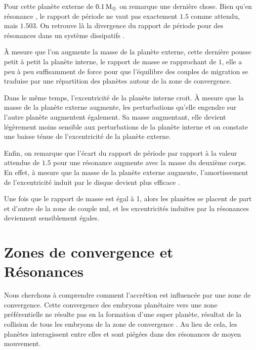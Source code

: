 Pour cette planète externe de $0.1\mathrm{\thinspace M_\oplus}$ on remarque une dernière chose. Bien qu'en résonance , le rapport de période
ne vaut pas exactement $1.5$ comme attendu, mais $1.503$. On retrouve là la divergence du rapport de période pour des
résonances dans un système dissipatifs \citep{batygin2013dissipative}. 

\bigskip

À mesure que l'on augmente la masse de la planète externe, cette dernière pousse petit à petit la planète interne, le rapport
de masse se rapprochant de $1$, elle a peu à peu suffisamment de force pour que l'équilibre des couples de migration se
traduise par une répartition des planètes autour de la zone de convergence. 

Dans le même temps, l'excentricité de la planète interne croit. À mesure que la masse de la planète externe augmente, les
perturbations qu'elle engendre sur l'autre planète augmentent également. Sa masse augmentant, elle devient légèrement moins
sensible aux perturbations de la planète interne et on constate une baisse ténue de l'excentricité de la planète externe. 

Enfin, on remarque que l'écart du rapport de période par rapport à la valeur attendue de $1.5$ pour une résonance 
augmente avec la masse du deuxième corps. En effet, à mesure que la masse de la planète externe augmente, l'amortissement de
l'excentricité induit par le disque devient plus efficace \citep[eq. (9)]{cresswell2008three}. 

\bigskip

Une fois que le rapport de masse est égal à 1, alors les planètes se placent de part et d'autre de la zone de couple nul, et
les excentricités induites par la résonances deviennent sensiblement égales.

\section{Zones de convergence et Résonances}

Nous cherchons à comprendre comment l'accrétion est influencée par une zone de convergence. Cette convergence des embryons planétaire vers une zone préférentielle ne résulte pas en la formation d'une super planète, résultat de la collision de tous les embryons de la zone de convergence \citep{morbidelli2008building, sandor2011formation}. Au lieu de cela, les planètes interagissent entre elles et sont piégées dans des résonances de moyen mouvement. 

